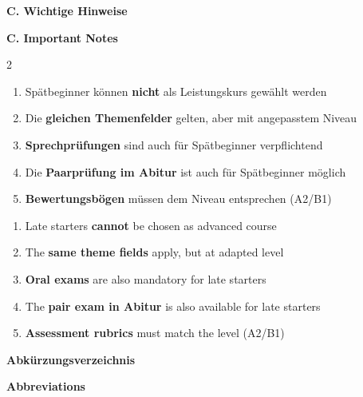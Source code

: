 \documentclass[10pt,a4paper]{article}
\newcommand{\secbil}[2]{%
\vspace{6pt}
\noindent\colorbox{spaet}{\parbox{0.48\textwidth}{\color{white}\bfseries\small #1}}%
\hfill%
\colorbox{english}{\parbox{0.48\textwidth}{\color{white}\bfseries\small #2}}
\vspace{3pt}
}
\begin{document}
\vspace{4mm}

\secbil{C. Wichtige Hinweise}{C. Important Notes}

\begin{paracol}{2}
\small
\begin{enumerate}[noitemsep,topsep=2pt]
\item Spätbeginner können \textbf{nicht} als Leistungskurs gewählt werden
\item Die \textbf{gleichen Themenfelder} gelten, aber mit angepasstem Niveau
\item \textbf{Sprechprüfungen} sind auch für Spätbeginner verpflichtend
\item Die \textbf{Paarprüfung im Abitur} ist auch für Spätbeginner möglich
\item \textbf{Bewertungsbögen} müssen dem Niveau entsprechen (A2/B1)
\end{enumerate}

\switchcolumn

\small\color{english}
\begin{enumerate}[noitemsep,topsep=2pt]
\item Late starters \textbf{cannot} be chosen as advanced course
\item The \textbf{same theme fields} apply, but at adapted level
\item \textbf{Oral exams} are also mandatory for late starters
\item The \textbf{pair exam in Abitur} is also available for late starters
\item \textbf{Assessment rubrics} must match the level (A2/B1)
\end{enumerate}

\end{paracol}

\vspace{6mm}

\vspace{4mm}
\secbil{Abkürzungsverzeichnis}{Abbreviations}

\vspace{2mm}
\end{document}
